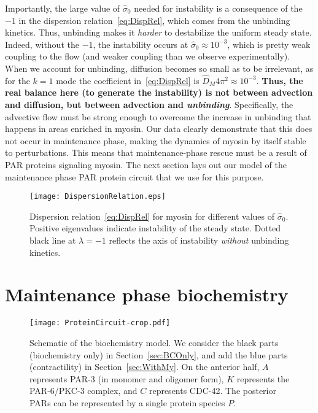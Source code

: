\documentclass[11pt]{article}
\newcommand{\6}[1]{#1_{\text{6}}}
\newcommand{\3}[1]{#1_{\text{3}}}
\begin{document}
Importantly, the large value of $\hat \sigma_0$ needed for instability is a consequence of the $-1$ in the dispersion relation\ \eqref{eq:DispRel}, which comes from the unbinding kinetics. Thus, unbinding makes it \emph{harder} to destabilize the uniform steady state. Indeed, without the $-1$, the instability occurs at $\hat{\sigma}_0 \approx 10^{-3}$, which is pretty weak coupling to the flow (and weaker coupling than we observe experimentally). When we account for unbinding, diffusion becomes so small as to be irrelevant, as for the $k=1$ mode the coefficient in\ \eqref{eq:DispRel} is $\hat{D}_M 4 \pi^2 \approx 10^{-3}$. \textbf{Thus, the real balance here (to generate the instability) is not between advection and diffusion, but between advection and \emph{unbinding}}. Specifically, the advective flow must be strong enough to overcome the increase in unbinding that happens in areas enriched in myosin. Our data clearly demonstrate that this does not occur in maintenance phase, making the dynamics of myosin by itself stable to perturbations. This means that maintenance-phase rescue must be a result of PAR proteins signaling myosin. The next section lays out our model of the maintenance phase PAR protein circuit that we use for this purpose. 

\begin{figure}
\centering
\texttt{[image: DispersionRelation.eps]}
\caption{\label{fig:DispRelMy}Dispersion relation\ \eqref{eq:DispRel} for myosin for different values of $\hat{\sigma}_0$. Positive eigenvalues indicate instability of the steady state. Dotted black line at $\lambda=-1$ reflects the axis of instability \emph{without} unbinding kinetics.}
\end{figure}


\section{Maintenance phase biochemistry \label{sec:BCOnly}}
\begin{figure}
\centering
\texttt{[image: ProteinCircuit-crop.pdf]}
\caption{\label{fig:ModelSch}Schematic of the biochemistry model. We consider the black parts (biochemistry only) in Section\ \ref{sec:BCOnly}, and add the blue parts (contractility) in Section\ \ref{sec:WithMy}. On the anterior half, $A$ represents PAR-3 (in monomer and oligomer form), $K$ represents the PAR-6/PKC-3 complex, and $C$ represents CDC-42. The posterior PARs can be represented by a single protein species $P$.}
\end{figure}
\end{document}
